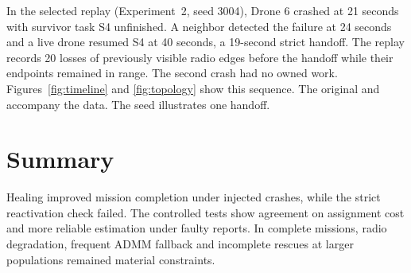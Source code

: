 In the selected replay (Experiment~2, seed 3004), Drone 6 crashed at 21 seconds with survivor task S4 unfinished. A neighbor detected the failure at 24 seconds and a live drone resumed S4 at 40 seconds, a 19-second strict handoff. The replay records 20 losses of previously visible radio edges before the handoff while their endpoints remained in range. The second crash had no owned work. Figures~\ref{fig:timeline} and \ref{fig:topology} show this sequence. The original  and  accompany the data. The seed illustrates one handoff.

\section{Summary}
Healing improved mission completion under injected crashes, while the strict reactivation check failed. The controlled tests show agreement on assignment cost and more reliable estimation under faulty reports. In complete missions, radio degradation, frequent ADMM fallback and incomplete rescues at larger populations remained material constraints.

